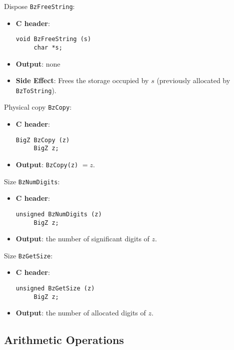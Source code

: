 \begin{func} Dispose  \verb+BzFreeString+:
\begin{itemize}
  \item{\bf C header}:
\begin{verbatim}
void BzFreeString (s)
     char *s;
\end{verbatim}
  \item{\bf Output}: none
  \item{\bf Side Effect}: Frees the storage occupied by $s$ (previously allocated by \verb+BzToString+).
\end{itemize}
\end{func}
 
\begin{func} Physical copy  \verb+BzCopy+:
\begin{itemize}
  \item{\bf C header}:
\begin{verbatim}
BigZ BzCopy (z)
     BigZ z;
\end{verbatim}
  \item{\bf Output}: \verb+BzCopy(z)+ $= z  $.
\end{itemize}
\end{func}

\begin{func} Size  \verb+BzNumDigits+:
\begin{itemize}
  \item{\bf C header}:
\begin{verbatim}
unsigned BzNumDigits (z)
     BigZ z;
\end{verbatim}
  \item{\bf Output}: the number of significant digits of $z$.
\end{itemize}
\end{func}
 
\begin{func} Size  \verb+BzGetSize+:
\begin{itemize}
  \item{\bf C header}:
\begin{verbatim}
unsigned BzGetSize (z)
     BigZ z;
\end{verbatim}
  \item{\bf Output}: the number of allocated digits of $z$.
\end{itemize}
\end{func}
 
\subsection{Arithmetic Operations}
 
